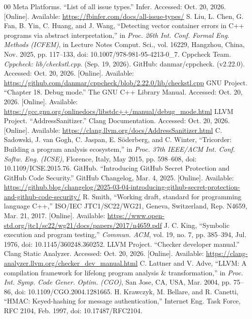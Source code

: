 \documentclass[conference]{IEEEtran}
\begin{document}
\begin{thebibliography}{00}
 Meta Platforms. ``List of all issue types.'' Infer. Accessed: Oct. 20, 2026. [Online]. Available: \url{https://fbinfer.com/docs/all-issue-types/}
 S. Liu, L. Chen, G. Fan, B. Yin, C. Huang, and J. Wang, ``Detecting vector container errors in C++ programs via abstract interpretation,'' in \textit{Proc. 26th Int. Conf. Formal Eng. Methods (ICFEM)}, in Lecture Notes Comput. Sci., vol. 16229, Hangzhou, China, Nov. 2025, pp. 117--133, doi: 10.1007/978-981-95-4213-0\_7.
 Cppcheck Team. \textit{Cppcheck: lib/checkstl.cpp}. (Sep. 19, 2026). GitHub: danmar/cppcheck. (v2.22.0). Accessed: Oct. 20, 2026. [Online]. Available: \url{https://github.com/danmar/cppcheck/blob/2.22.0/lib/checkstl.cpp}
 GNU Project. ``Chapter 18. Debug mode.'' The GNU C++ Library Manual. Accessed: Oct. 20, 2026. [Online]. Available: \url{https://gcc.gnu.org/onlinedocs/libstdc++/manual/debug_mode.html}
 LLVM Project. ``AddressSanitizer.'' Clang Documentation. Accessed: Oct. 20, 2026. [Online]. Available: \url{https://clang.llvm.org/docs/AddressSanitizer.html}
 C. Sadowski, J. van Gogh, C. Jaspan, E. Söderberg, and C. Winter, ``Tricorder: Building a program analysis ecosystem,'' in \textit{Proc. 37th IEEE/ACM Int. Conf. Softw. Eng. (ICSE)}, Florence, Italy, May 2015, pp. 598--608, doi: 10.1109/ICSE.2015.76.
 GitHub. ``Introducing GitHub Secret Protection and GitHub Code Security.'' GitHub Changelog, Mar. 4, 2025. [Online]. Available: \url{https://github.blog/changelog/2025-03-04-introducing-github-secret-protection-and-github-code-security/}
 R. Smith, ``Working draft, standard for programming language C++,'' ISO/IEC JTC1/SC22/WG21, Geneva, Switzerland, Rep. N4659, Mar. 21, 2017. [Online]. Available: \url{https://www.open-std.org/jtc1/sc22/wg21/docs/papers/2017/n4659.pdf}
 J. C. King, ``Symbolic execution and program testing,'' \textit{Commun. ACM}, vol. 19, no. 7, pp. 385--394, Jul. 1976, doi: 10.1145/360248.360252.
 LLVM Project. ``Checker developer manual.'' Clang Static Analyzer. Accessed: Oct. 20, 2026. [Online]. Available: \url{https://clang-analyzer.llvm.org/checker_dev_manual.html}
 C. Lattner and V. Adve, ``LLVM: A compilation framework for lifelong program analysis \& transformation,'' in \textit{Proc. Int. Symp. Code Gener. Optim. (CGO)}, San Jose, CA, USA, Mar. 2004, pp. 75--86, doi: 10.1109/CGO.2004.1281665.
 H. Krawczyk, M. Bellare, and R. Canetti, ``HMAC: Keyed-hashing for message authentication,'' Internet Eng. Task Force, RFC 2104, Feb. 1997, doi: 10.17487/RFC2104.

\end{thebibliography}
\end{document}
